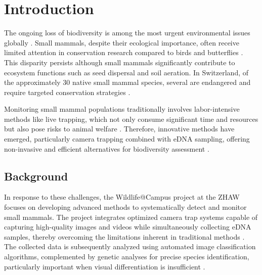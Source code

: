 

\section{Introduction}
\label{introduction}

The ongoing loss of biodiversity is among the most urgent environmental issues globally \autocite{brondizioGlobalAssessmentReport2019, cardinaleBiodiversityLossIts2012}.
Small mammals, despite their ecological importance, often receive limited attention in conservation research compared to birds and butterflies \autocite{grafWildlifeCampusKleineSaeugetiere2022}.
This disparity persists although small mammals significantly contribute to ecosystem functions such as seed dispersal and soil aeration.
In Switzerland, of the approximately 30 native small mammal species, several are endangered and require targeted conservation strategies \autocite{bafuListeNationalPrioritaren2019}.

Monitoring small mammal populations traditionally involves labor-intensive methods like live trapping, which not only consume significant time and resources but also pose risks to animal welfare \autocite{grafWildlifeCampusKleineSaeugetiere2022}.
Therefore, innovative methods have emerged, particularly camera trapping combined with \ac{eDNA} sampling, offering non-invasive and efficient alternatives for biodiversity assessment \autocite{aegerterMonitoringKleinmustelidenSchlaefern2019}.

\subsection{Background}

In response to these challenges, the Wildlife@Campus project at the \ac{ZHAW} focuses on developing advanced methods to systematically detect and monitor small mammals.
The project integrates optimized camera trap systems capable of capturing high-quality images and videos while simultaneously collecting \ac{eDNA} samples, thereby overcoming the limitations inherent in traditional methods \autocite{grafWildlifeCampusKleineSaeugetiere2022}.
The collected data is subsequently analyzed using automated image classification algorithms, complemented by genetic analyses for precise species identification, particularly important when visual differentiation is insufficient \autocite{ratnaweeraWildlifeCampusProgressReports2021}.

